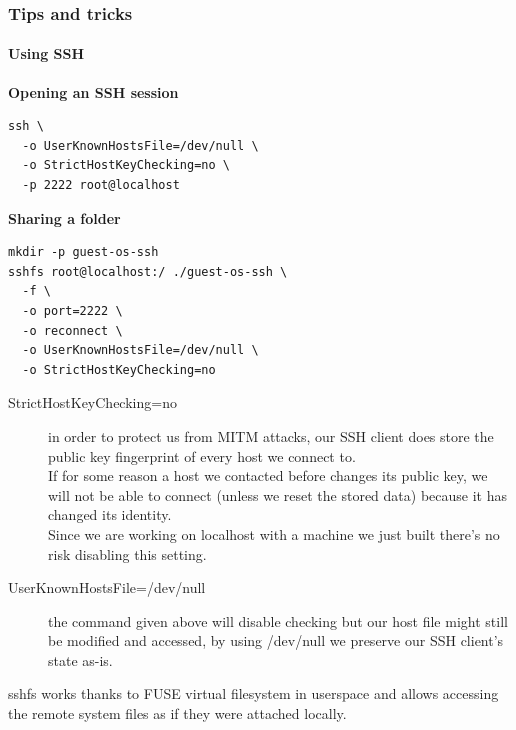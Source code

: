 \begin{frame}[fragile]
  \frametitle{Tips and tricks}
  \framesubtitle{Using SSH}
  \begin{center}
    \textbf{Opening an SSH session}
  \end{center}
  \begin{verbatim}
ssh \
  -o UserKnownHostsFile=/dev/null \
  -o StrictHostKeyChecking=no \
  -p 2222 root@localhost
  \end{verbatim}

  \begin{center}
    \textbf{Sharing a folder}
  \end{center}
  \begin{verbatim}
mkdir -p guest-os-ssh
sshfs root@localhost:/ ./guest-os-ssh \
  -f \
  -o port=2222 \
  -o reconnect \
  -o UserKnownHostsFile=/dev/null \
  -o StrictHostKeyChecking=no
  \end{verbatim}
\end{frame}
\only<handout> {
  \begin{description}
    \item[StrictHostKeyChecking=no] in order to protect us from MITM attacks,
      our SSH client does store the public key fingerprint of every host we connect to. \\
      If for some reason a host we contacted before changes its public key, we will not be able
      to connect (unless we reset the stored data) because it has changed its identity. \\
      Since we are working on localhost with a machine we just built there's no risk disabling this setting.
    \item[UserKnownHostsFile=/dev/null] the command given above will disable checking but our host file might
      still be modified and accessed, by using /dev/null we preserve our SSH client's state as-is.
  \end{description}
  sshfs works thanks to FUSE virtual filesystem in userspace and allows accessing the remote system files as if they were attached locally.
}


